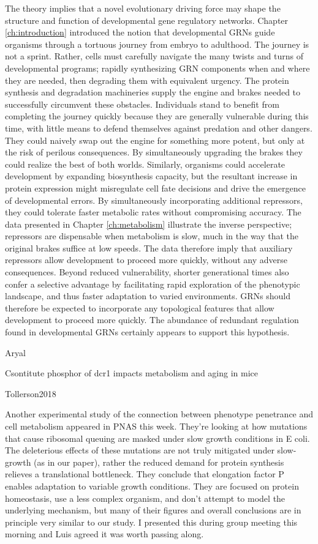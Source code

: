 The theory implies that a novel evolutionary driving force may shape the structure and function of developmental gene regulatory networks. Chapter \ref{ch:introduction} introduced the notion that developmental GRNs guide organisms through a tortuous journey from embryo to adulthood. The journey is not a sprint. Rather, cells must carefully navigate the many twists and turns of developmental programs; rapidly synthesizing GRN components when and where they are needed, then degrading them with equivalent urgency. The protein synthesis and degradation machineries supply the engine and brakes needed to successfully circumvent these obstacles. Individuals stand to benefit from completing the journey quickly because they are generally vulnerable during this time, with little means to defend themselves against predation and other dangers. They could naively swap out the engine for something more potent, but only at the risk of perilous consequences. By simultaneously upgrading the brakes they could realize the best of both worlds. Similarly, organisms could accelerate development by expanding biosynthesis capacity, but the resultant increase in protein expression might misregulate cell fate decisions and drive the emergence of developmental errors. By simultaneously incorporating additional repressors, they could tolerate faster metabolic rates without compromising accuracy. The data presented in Chapter \ref{ch:metabolism} illustrate the inverse perspective; repressors are dispensable when metabolism is slow, much in the way that the original brakes suffice at low speeds. The data therefore imply that auxiliary repressors allow development to proceed more quickly, without any adverse consequences. Beyond reduced vulnerability, shorter generational times also confer a selective advantage by facilitating rapid exploration of the phenotypic landscape, and thus faster adaptation to varied environments. GRNs should therefore be expected to incorporate any topological features that allow development to proceed more quickly. The abundance of redundant regulation found in developmental GRNs certainly appears to support this hypothesis.




Aryal


Csontitute phosphor of dcr1 impacts metabolism and aging in mice


Tollerson2018

Another experimental study of the connection between phenotype penetrance and cell metabolism appeared in PNAS this week. They're looking at how mutations that cause ribosomal queuing are masked under slow growth conditions in E coli. The deleterious effects of these mutations are not truly mitigated under slow-growth (as in our paper), rather the reduced demand for protein synthesis relieves a translational bottleneck. They conclude that elongation factor P enables adaptation to variable growth conditions. They are focused on protein homeostasis, use a less complex organism, and don't attempt to model the underlying mechanism, but many of their figures and overall conclusions are in principle very similar to our study. I presented this during group meeting this morning and Luis agreed it was worth passing along.



